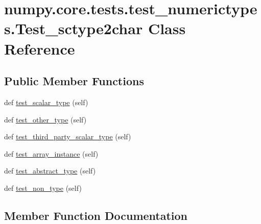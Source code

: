\hypertarget{classnumpy_1_1core_1_1tests_1_1test__numerictypes_1_1Test__sctype2char}{}\section{numpy.\+core.\+tests.\+test\+\_\+numerictypes.\+Test\+\_\+sctype2char Class Reference}
\label{classnumpy_1_1core_1_1tests_1_1test__numerictypes_1_1Test__sctype2char}
\subsection*{Public Member Functions}
\begin{DoxyCompactItemize}
\item 
def \hyperlink{classnumpy_1_1core_1_1tests_1_1test__numerictypes_1_1Test__sctype2char_a920eaab1b56625b236ea5e9b34928ac1}{test\+\_\+scalar\+\_\+type} (self)
\item 
def \hyperlink{classnumpy_1_1core_1_1tests_1_1test__numerictypes_1_1Test__sctype2char_a9ce635e0c8be2bbb3440157143fbfcc6}{test\+\_\+other\+\_\+type} (self)
\item 
def \hyperlink{classnumpy_1_1core_1_1tests_1_1test__numerictypes_1_1Test__sctype2char_a9a28aaf28259264e4a201f8207424599}{test\+\_\+third\+\_\+party\+\_\+scalar\+\_\+type} (self)
\item 
def \hyperlink{classnumpy_1_1core_1_1tests_1_1test__numerictypes_1_1Test__sctype2char_aca95295284b5b19f99a92cbaa76a0c6f}{test\+\_\+array\+\_\+instance} (self)
\item 
def \hyperlink{classnumpy_1_1core_1_1tests_1_1test__numerictypes_1_1Test__sctype2char_af7050210e124177c08ccc7495a24f401}{test\+\_\+abstract\+\_\+type} (self)
\item 
def \hyperlink{classnumpy_1_1core_1_1tests_1_1test__numerictypes_1_1Test__sctype2char_a8adf7ae7945a1bbc06572505ba1636f1}{test\+\_\+non\+\_\+type} (self)
\end{DoxyCompactItemize}


\subsection{Member Function Documentation}
\mbox{\label{classnumpy_1_1core_1_1tests_1_1test__numerictypes_1_1Test__sctype2char_af7050210e124177c08ccc7495a24f401}} 
